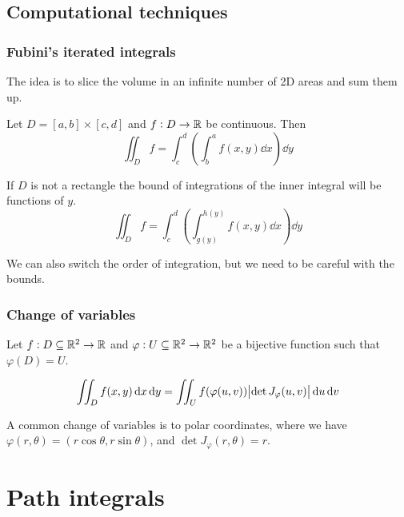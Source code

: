 \documentclass[12pt]{extarticle}
\begin{document}
\subsection{Computational techniques}

\subsubsection{Fubini's iterated integrals}

The idea is to slice the volume in an infinite number of 2D areas and sum them up.

\begin{theorem}[Fubini]
    Let $D = [a, b] \times [c, d]$ and $f: D \to \mathbb{R}$ be continuous.
    Then
    \begin{equation}
        \iint_D f = \int_c^d \left( \int_{b}^{a} f(x, y) \dd{x} \right) \dd{y}
    \end{equation}

    If $D$ is not a rectangle the bound of integrations of the inner integral will be functions of $y$.
    \begin{equation}
        \iint_D f = \int_{c}^{d} \left( \int_{g(y)}^{h(y)} f(x, y) \dd{x} \right) \dd{y}
    \end{equation}
\end{theorem}

\begin{remark}
    We can also switch the order of integration, but we need to be careful with the bounds.
\end{remark}

\subsubsection{Change of variables}

Let $f: D \subseteq \mathbb{R}^2 \to \mathbb{R}$ and $\varphi: U \subseteq \mathbb{R}^2 \to \mathbb{R}^2$ be a bijective function such that $\varphi(D) = U$.

\begin{equation}
    \iint_D f(x, y) \dd{x} \dd{y} = \iint_U f(\varphi(u, v)) \abs{\det J_{\varphi}(u, v)} \dd{u} \dd{v}
\end{equation}

A common change of variables is to polar coordinates, where we have $\varphi(r, \theta) = (r \cos \theta, \allowbreak r \sin \theta)$, and $\det J_{\varphi}(r, \theta) = r$.


\section{Path integrals}
\end{document}
